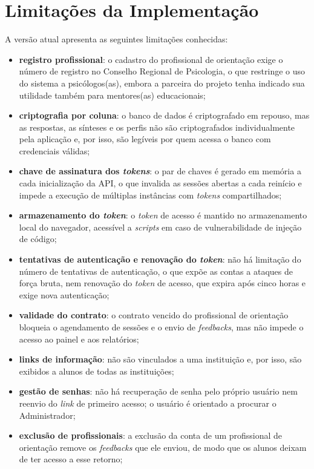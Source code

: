 \section{Limitações da Implementação}

A versão atual apresenta as seguintes limitações conhecidas:

\begin{itemize}
  \item \textbf{registro profissional}: o cadastro do profissional de orientação exige o número de registro no Conselho Regional de Psicologia, o que restringe o uso do sistema a psicólogos(as), embora a parceira do projeto tenha indicado sua utilidade também para mentores(as) educacionais;
  \item \textbf{criptografia por coluna}: o banco de dados é criptografado em repouso, mas as respostas, as sínteses e os perfis não são criptografados individualmente pela aplicação e, por isso, são legíveis por quem acessa o banco com credenciais válidas;
  \item \textbf{chave de assinatura dos \textit{tokens}}: o par de chaves é gerado em memória a cada inicialização da API, o que invalida as sessões abertas a cada reinício e impede a execução de múltiplas instâncias com \textit{tokens} compartilhados;
  \item \textbf{armazenamento do \textit{token}}: o \textit{token} de acesso é mantido no armazenamento local do navegador, acessível a \textit{scripts} em caso de vulnerabilidade de injeção de código;
  \item \textbf{tentativas de autenticação e renovação do \textit{token}}: não há limitação do número de tentativas de autenticação, o que expõe as contas a ataques de força bruta, nem renovação do \textit{token} de acesso, que expira após cinco horas e exige nova autenticação;
  \item \textbf{validade do contrato}: o contrato vencido do profissional de orientação bloqueia o agendamento de sessões e o envio de \textit{feedbacks}, mas não impede o acesso ao painel e aos relatórios;
  \item \textbf{links de informação}: não são vinculados a uma instituição e, por isso, são exibidos a alunos de todas as instituições;
  \item \textbf{gestão de senhas}: não há recuperação de senha pelo próprio usuário nem reenvio do \textit{link} de primeiro acesso; o usuário é orientado a procurar o Administrador;
  \item \textbf{exclusão de profissionais}: a exclusão da conta de um profissional de orientação remove os \textit{feedbacks} que ele enviou, de modo que os alunos deixam de ter acesso a esse retorno;

\end{itemize}
